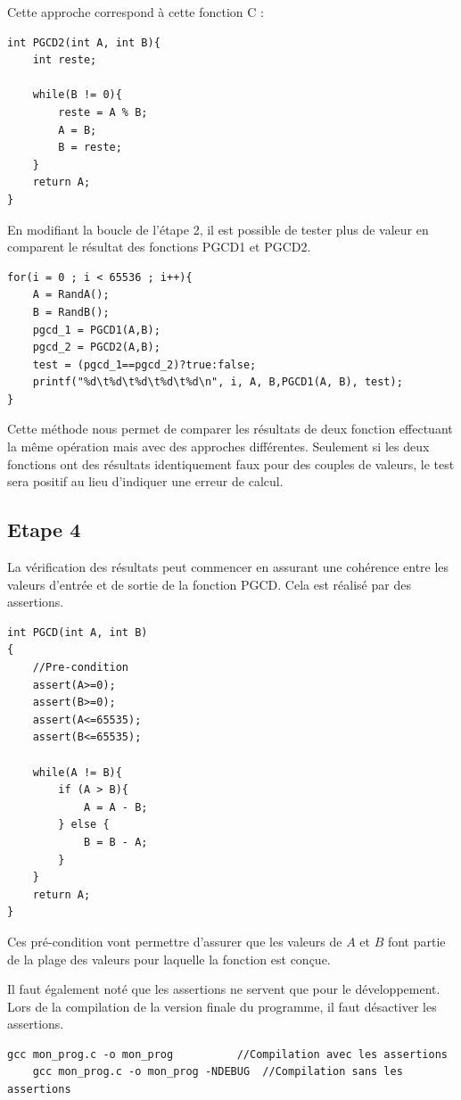 \documentclass[a4paper]{article}
\begin{document}
        Cette approche correspond à cette fonction C :
\begin{lstlisting}[style=CStyle]
int PGCD2(int A, int B){
	int reste;

	while(B != 0){
		reste = A % B;
		A = B;
		B = reste;
	}
	return A;
}
\end{lstlisting}
        En modifiant la boucle de l'étape 2, il est possible de tester plus de valeur en comparent le résultat des fonctions PGCD1 et PGCD2.
\begin{lstlisting}[style=CStyle]
for(i = 0 ; i < 65536 ; i++){
	A = RandA();
	B = RandB();
	pgcd_1 = PGCD1(A,B);
	pgcd_2 = PGCD2(A,B);
	test = (pgcd_1==pgcd_2)?true:false;
	printf("%d\t%d\t%d\t%d\t%d\n", i, A, B,PGCD1(A, B), test);
}
\end{lstlisting}
        Cette méthode nous permet de comparer les résultats de deux fonction effectuant la même opération mais avec des approches différentes. Seulement si les deux fonctions ont des résultats identiquement faux pour des couples de valeurs, le test sera positif au lieu d'indiquer une erreur de calcul.
    \newpage
    \subsection{Etape 4}
        La vérification des résultats peut commencer en assurant une cohérence entre les valeurs d'entrée et de sortie de la fonction PGCD. Cela est réalisé par des assertions.
 \begin{lstlisting}[style=CStyle]
int PGCD(int A, int B)
{
    //Pre-condition
	assert(A>=0);
	assert(B>=0);
	assert(A<=65535);
	assert(B<=65535);
	
	while(A != B){
		if (A > B){
			A = A - B;
		} else {
			B = B - A;
		}
	}
	return A;
}
\end{lstlisting}
         Ces pré-condition vont permettre d'assurer que les valeurs de $A$ et $B$ font partie de la plage des valeurs pour laquelle la fonction est conçue.

         Il faut également noté que les assertions ne servent que pour le développement. Lors de la compilation de la version finale du programme, il faut désactiver les assertions.
\begin{lstlisting}[style=CStyle]
    gcc mon_prog.c -o mon_prog          //Compilation avec les assertions
    gcc mon_prog.c -o mon_prog -NDEBUG  //Compilation sans les assertions
\end{lstlisting}
\end{document}
